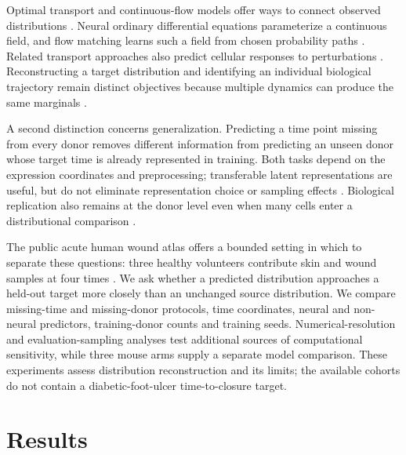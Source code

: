 \documentclass[10pt,a4paper]{article}
\begin{document}
Optimal transport and continuous-flow models offer ways to connect observed distributions \citep{schiebinger2019,tong2020trajectory,lipman2023,tong2023}. Neural ordinary differential equations parameterize a continuous field, and flow matching learns such a field from chosen probability paths \citep{chen2018ode,lipman2024guide}. Related transport approaches also predict cellular responses to perturbations \citep{bunne2023}. Reconstructing a target distribution and identifying an individual biological trajectory remain distinct objectives because multiple dynamics can produce the same marginals \citep{lavenant2021,weinreb2018}.

A second distinction concerns generalization. Predicting a time point missing from every donor removes different information from predicting an unseen donor whose target time is already represented in training. Both tasks depend on the expression coordinates and preprocessing; transferable latent representations are useful, but do not eliminate representation choice or sampling effects \citep{lopez2018,heumos2023}. Biological replication also remains at the donor level even when many cells enter a distributional comparison \citep{zimmerman2021}.

The public acute human wound atlas offers a bounded setting in which to separate these questions: three healthy volunteers contribute skin and wound samples at four times \citep{liu2025_wound,geo_gse241132}. We ask whether a predicted distribution approaches a held-out target more closely than an unchanged source distribution. We compare missing-time and missing-donor protocols, time coordinates, neural and non-neural predictors, training-donor counts and training seeds. Numerical-resolution and evaluation-sampling analyses test additional sources of computational sensitivity, while three mouse arms supply a separate model comparison. These experiments assess distribution reconstruction and its limits; the available cohorts do not contain a diabetic-foot-ulcer time-to-closure target.

\section{Results}

\FloatBarrier


\end{document}
